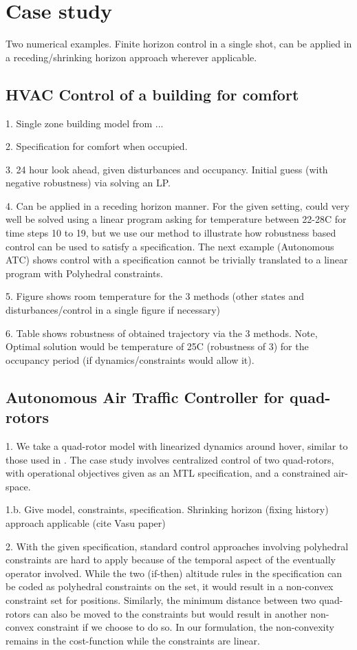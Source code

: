 \section{Case study}
\label{sec:case study}
Two numerical examples. Finite horizon control in a single shot, can be applied in a receding/shrinking horizon approach wherever applicable. 


\subsection{HVAC Control of a building for comfort}
1. Single zone building model from ...

2. Specification for comfort when occupied.

3. 24 hour look ahead, given disturbances and occupancy. Initial guess (with negative robustness) via solving an LP.

4. Can be applied in a receding horizon manner. For the given setting, could very well be solved using a linear program asking for temperature between 22-28C for time steps 10 to 19, but we use our method to illustrate how robustness based control can be used to satisfy a specification. The next example (Autonomous ATC) shows control with a specification cannot be trivially translated to a linear program with Polyhedral constraints.

5. Figure shows room temperature for the 3 methods (other states and disturbances/control in a single figure if necessary)

6. Table shows robustness of obtained trajectory via the 3 methods. Note, Optimal solution would be temperature of 25C  (robustness of 3) for the occupancy period (if dynamics/constraints would allow it).



\subsection{Autonomous Air Traffic Controller for quad-rotors}
1. We take a quad-rotor model with linearized dynamics around hover, similar to those used in \cite{}. The case study involves centralized control of two quad-rotors, with operational objectives given as an MTL specification, and a constrained air-space.

1.b. Give model, constraints, specification. Shrinking horizon (fixing history) approach applicable (cite Vasu paper)

2. With the given specification, standard control approaches involving polyhedral constraints are hard to apply because of the temporal aspect of the eventually operator involved. While the two (if-then) altitude rules in the specification can be coded as polyhedral constraints on the set, it would result in a non-convex constraint set for positions. Similarly, the minimum distance between two quad-rotors can also be moved to the constraints but would result in another non-convex constraint if we choose to do so. In our formulation, the non-convexity remains in the cost-function while the constraints are linear.

